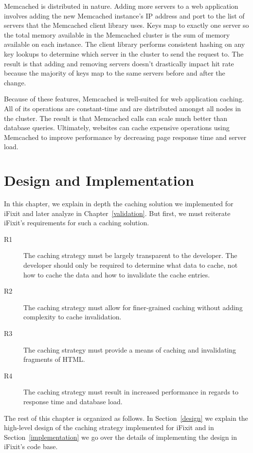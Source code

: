 \documentclass[12pt]{ucthesis}
\begin{document}
\textsf{Memcached} is distributed in nature.
Adding more servers to a web application involves adding the new \textsf{Memcached} instance's IP address and port to the list of servers that the \textsf{Memcached} client library uses.
Keys map to exactly one server so the total memory available in the \textsf{Memcached} cluster is the sum of memory available on each instance.
The client library performs consistent hashing\cite{consistentHashing} on any key lookups to determine which server in the cluster to send the request to.
The result is that adding and removing servers doesn't drastically impact hit rate because the majority of keys map to the same servers before and after the change.

Because of these features, \textsf{Memcached} is well-suited for web application caching.
All of its operations are constant-time and are distributed amongst all nodes in the cluster.
The result is that \textsf{Memcached} calls can scale much better than database queries.
Ultimately, websites can cache expensive operations using \textsf{Memcached} to improve performance by decreasing page response time and server load.


\chapter{Design and Implementation} \label{designAndImplementation}
In this chapter, we explain in depth the caching solution we implemented for \textsf{iFixit} and later analyze in Chapter~\ref{validation}.
But first, we must reiterate \textsf{iFixit}'s requirements for such a caching solution.

\begin{description}
   \item[R1] The caching strategy must be largely transparent to the developer.
             The developer should only be required to determine what data to cache, not how to cache the data and how to invalidate the cache entries.
   \item[R2] The caching strategy must allow for finer-grained caching without adding complexity to cache invalidation.
   \item[R3] The caching strategy must provide a means of caching and invalidating fragments of HTML\@.
   \item[R4] The caching strategy must result in increased performance in regards to response time and database load.
\end{description}

The rest of this chapter is organized as follows.
In Section~\ref{design} we explain the high-level design of the caching strategy implemented for \textsf{iFixit} and in Section~\ref{implementation} we go over the details of implementing the design in \textsf{iFixit}'s code base.
\end{document}
